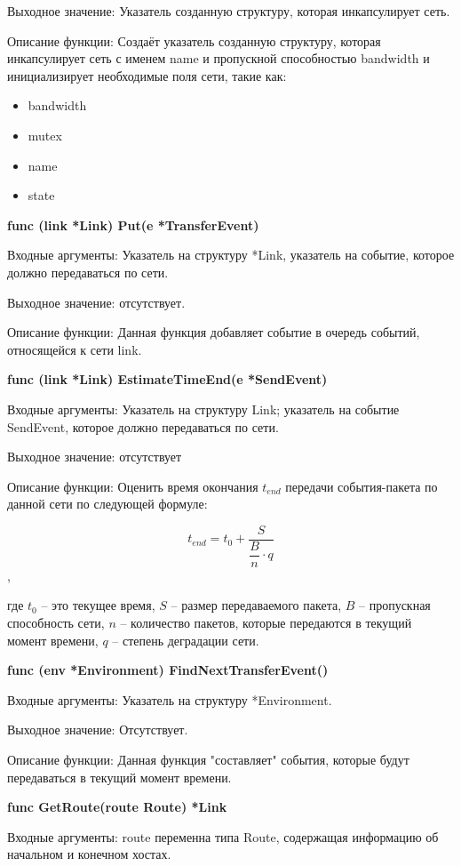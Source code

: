Выходное значение: Указатель созданную структуру, которая инкапсулирует сеть. 

Описание функции: Создаёт указатель созданную структуру, которая инкапсулирует сеть с именем name и пропускной способностью bandwidth и инициализирует необходимые поля сети, такие как:

\begin{itemize}
\item bandwidth 
\item mutex    
\item name   
\item state  
\end{itemize}




\textbf{func (link *Link) Put(e *TransferEvent)}

Входные аргументы: Указатель на структуру *Link, указатель на событие, которое должно передаваться по сети.

Выходное значение: отсутствует.

Описание функции: Данная функция добавляет событие в очередь событий, относящейся к сети link. 


\textbf{func (link *Link) EstimateTimeEnd(e *SendEvent)}

Входные аргументы: Указатель на структуру Link; указатель на событие SendEvent, которое должно передаваться по сети.

Выходное значение: отсутствует

Описание функции: Оценить время окончания  $t_{end}$ передачи события-пакета по данной сети по следующей формуле:

\[ t_{end} = t_0 + \dfrac{S}{\dfrac{B}{n}  \cdot q }  \], 

где $t_0$ -- это текущее время, \(S\) -- размер передаваемого пакета,  \(B\) -- пропускная способность сети, \(n\) -- количество пакетов, которые передаются в текущий момент времени,  \(q\) -- степень деградации сети. 


\textbf{func (env *Environment) FindNextTransferEvent()}

Входные аргументы: Указатель на структуру *Environment.

Выходное значение: Отсутствует. 

Описание функции: Данная функция "составляет" события, которые будут передаваться в текущий момент времени.  


\textbf{func GetRoute(route Route) *Link}

Входные аргументы: route переменна типа Route, содержащая информацию об начальном и конечном хостах.


